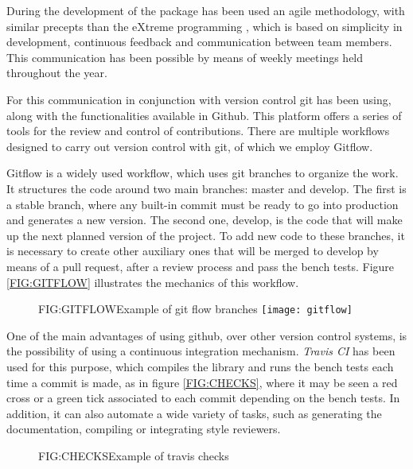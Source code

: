 During the development of the package has been used an agile methodology, with
similar precepts than the eXtreme programming \cite{eXtreme}, which is based on
simplicity in development, continuous feedback and communication between
team members. This communication has been possible by means of weekly meetings held throughout the year.

For this communication in conjunction with version control git has been using,
along with the functionalities available in Github. This platform offers a
series of tools for the review and control of contributions. There are multiple
workflows designed to carry out version control with git, of which we employ
Gitflow.

Gitflow is a widely used workflow, which uses git branches to organize the work.
It structures the code around two main branches: master and develop. The first
is a stable branch, where any built-in commit must be ready to go into
production and generates a new version. The second one, develop, is the code
that will make up the next planned version of the project. To add new code to
these branches, it is necessary to create other auxiliary ones that will be
merged to develop by means of a pull request, after a review process and pass
the bench tests. Figure \ref{FIG:GITFLOW} illustrates the mechanics of this
workflow.


\begin{figure}[Example of git flow branches]{FIG:GITFLOW}{Example of git flow branches \footnotemark}
  \texttt{[image: gitflow]}
\end{figure}


One of the main advantages of using github, over other version control systems,
is the possibility of using a continuous integration mechanism. \textit{Travis CI} has
been used for this purpose, which compiles the library and runs the bench tests
each time a commit is made, as in figure \ref{FIG:CHECKS}, where it may be seen a red cross
or a green tick associated to each commit depending on the bench tests. In
addition, it can also automate a wide variety of tasks, such as generating the
documentation, compiling or integrating style reviewers.

\begin{figure}[Example of travis checks]{FIG:CHECKS}{Example of travis checks}
\end{figure}

